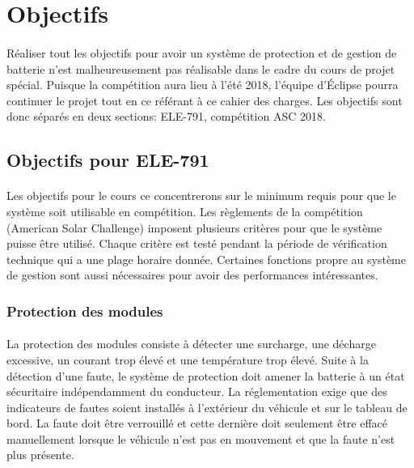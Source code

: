 
\section{Objectifs}
\paragraph{}
Réaliser tout les objectifs pour avoir un système de protection et de gestion de batterie  n'est malheureusement pas réalisable dans le cadre du cours de projet spécial. Puisque la compétition aura lieu à l'été 2018, l'équipe d'Éclipse pourra continuer le projet tout en ce référant à ce cahier des charges. Les objectifs sont donc séparés en deux sections: ELE-791, compétition ASC 2018.  

	\subsection{Objectifs pour ELE-791}
	\paragraph{}	
	Les objectifs pour le cours ce concentrerons sur le minimum requis pour que le système soit utilisable en compétition. Les règlements de la compétition (American Solar Challenge) imposent plusieurs critères pour que le système puisse être utilisé. Chaque critère est testé pendant la période de vérification technique qui a une plage horaire donnée. Certaines fonctions propre au système de gestion sont aussi nécessaires pour avoir des performances intéressantes.
		
		\subsubsection{Protection des modules} \label{protection_module}
		\paragraph{}
		La protection des modules consiste à détecter une surcharge, une décharge excessive, un courant trop élevé et une température trop élevé. Suite à la détection d'une faute, le système de protection doit amener la batterie à un état sécuritaire indépendamment du conducteur. La réglementation exige que des indicateurs de fautes soient installés à l'extérieur du véhicule et sur le tableau de bord. La faute doit être verrouillé et cette dernière doit seulement être effacé manuellement lorsque le véhicule n'est pas en mouvement et que la faute n'est plus présente.
	
